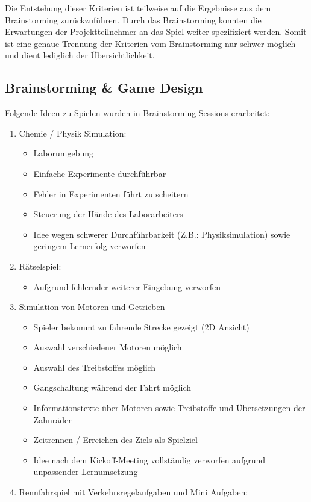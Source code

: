 Die Entstehung dieser Kriterien ist teilweise auf die Ergebnisse aus dem Brainstorming zurückzuführen. Durch das Brainstorming konnten die Erwartungen der Projektteilnehmer an das Spiel weiter spezifiziert werden. Somit ist eine genaue Trennung der Kriterien vom Brainstorming nur schwer möglich und dient lediglich der Übersichtlichkeit.

\subsection{Brainstorming \& Game Design}\label{ssec:idee}
	Folgende Ideen zu Spielen wurden in Brainstorming-Sessions erarbeitet:
\begin{enumerate}
	\item Chemie / Physik Simulation:
	\begin{itemize}
		\item Laborumgebung
		\item Einfache Experimente durchführbar
		\item Fehler in Experimenten führt zu scheitern
		\item Steuerung der Hände des Laborarbeiters
		\item Idee wegen schwerer Durchführbarkeit (Z.B.: Physiksimulation) sowie geringem Lernerfolg verworfen
	\end{itemize}
	\item Rätselspiel:
	\begin{itemize}
		\item Aufgrund fehlernder weiterer Eingebung verworfen
	\end{itemize}
	\item Simulation von Motoren und Getrieben
	\begin{itemize}
		\item Spieler bekommt zu fahrende Strecke gezeigt (2D Ansicht)
		\item Auswahl verschiedener Motoren möglich
		\item Auswahl des Treibstoffes möglich
		\item Gangschaltung während der Fahrt möglich
		\item Informationstexte über Motoren sowie Treibstoffe und Übersetzungen der Zahnräder
		\item Zeitrennen / Erreichen des Ziels als Spielziel
		\item Idee nach dem Kickoff-Meeting vollständig verworfen aufgrund unpassender Lernumsetzung
	\end{itemize}
	\item Rennfahrspiel mit Verkehrsregelaufgaben und Mini Aufgaben:

\end{enumerate}
